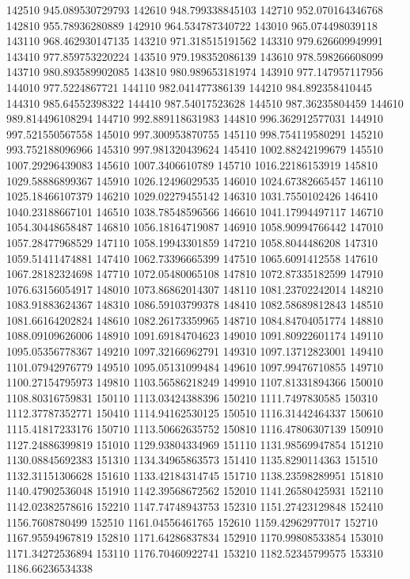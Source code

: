{142510 945.089530729793
142610 948.799338845103
142710 952.070164346768
142810 955.78936280889
142910 964.534787340722
143010 965.074498039118
143110 968.462930147135
143210 971.318515191562
143310 979.626609949991
143410 977.859753220224
143510 979.198352086139
143610 978.598266608099
143710 980.893589902085
143810 980.989653181974
143910 977.147957117956
144010 977.5224867721
144110 982.041477386139
144210 984.892358410445
144310 985.64552398322
144410 987.54017523628
144510 987.36235804459
144610 989.814496108294
144710 992.889118631983
144810 996.362912577031
144910 997.521550567558
145010 997.300953870755
145110 998.754119580291
145210 993.752188096966
145310 997.981320439624
145410 1002.88242199679
145510 1007.29296439083
145610 1007.3406610789
145710 1016.22186153919
145810 1029.58886899367
145910 1026.12496029535
146010 1024.67382665457
146110 1025.18466107379
146210 1029.02279455142
146310 1031.7550102426
146410 1040.23188667101
146510 1038.78548596566
146610 1041.17994497117
146710 1054.30448658487
146810 1056.18164719087
146910 1058.90994766442
147010 1057.28477968529
147110 1058.19943301859
147210 1058.8044486208
147310 1059.51411474881
147410 1062.73396665399
147510 1065.6091412558
147610 1067.28182324698
147710 1072.05480065108
147810 1072.87335182599
147910 1076.63156054917
148010 1073.86862014307
148110 1081.23702242014
148210 1083.91883624367
148310 1086.59103799378
148410 1082.58689812843
148510 1081.66164202824
148610 1082.26173359965
148710 1084.84704051774
148810 1088.09109626006
148910 1091.69184704623
149010 1091.80922601174
149110 1095.05356778367
149210 1097.32166962791
149310 1097.13712823001
149410 1101.07942976779
149510 1095.05131099484
149610 1097.99476710855
149710 1100.27154795973
149810 1103.56586218249
149910 1107.81331894366
150010 1108.80316759831
150110 1113.03424388396
150210 1111.7497830585
150310 1112.37787352771
150410 1114.94162530125
150510 1116.31442464337
150610 1115.41817233176
150710 1113.50662635752
150810 1116.47806307139
150910 1127.24886399819
151010 1129.93804334969
151110 1131.98569947854
151210 1130.08845692383
151310 1134.34965863573
151410 1135.8290114363
151510 1132.31151306628
151610 1133.42184314745
151710 1138.23598289951
151810 1140.47902536048
151910 1142.39568672562
152010 1141.26580425931
152110 1142.02382578616
152210 1147.74748943753
152310 1151.27423129848
152410 1156.7608780499
152510 1161.04556461765
152610 1159.42962977017
152710 1167.95594967819
152810 1171.64286837834
152910 1170.99808533854
153010 1171.34272536894
153110 1176.70460922741
153210 1182.52345799575
153310 1186.66236534338
}
